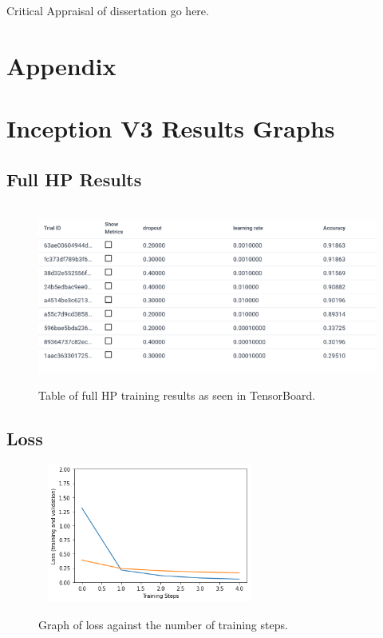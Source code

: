 \documentclass{article}
\begin{document}
Critical Appraisal of dissertation go here.

\clearpage
\printbibliography

\clearpage

\appendix

\section*{Appendix}

\section{Inception V3 Results Graphs}

\subsection{Full HP Results}

\label{subsec:hp}

\begin{figure}[h]\
    \centering
    \includegraphics[width=\textwidth]{full_hp.png}
    \caption{Table of full HP training results as seen in TensorBoard.}
    \label{fig:hp_full}
\end{figure}

\subsection{Loss}

\label{subsec:loss}

\begin{figure}[h]\
    \centering
    \includegraphics[width=0.6\textwidth]{inception_loss.png}
    \caption{Graph of loss against the number of training steps.}
    \label{fig:incep_loss}
\end{figure}
\end{document}
